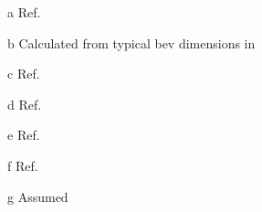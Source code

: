 \begin{table}[!htbp]
\begin{threeparttable}[t]
\begin{tabular*}{0.725\textwidth}{@{} l @{\extracolsep{\fill}}  S @{}}
			\bottomrule
		\end{tabular*}
        \begin{tablenotes}
        \item[a]Ref.~\cite{HybridCars2017Drag}
        \item[b]Calculated from typical \gls{bev} dimensions in~\cite{BoltDimensions}
        \item[c]Ref.~\cite{ETANTP002-2004}
        \item[d]Ref.~\cite{BoltOverview}
        \item[e]Ref.~\cite{Liu2016a}
        \item[f]Ref.~\cite{EmadiElectric}
        \item[g]Assumed
        \end{tablenotes}
	\end{threeparttable}
\end{table}
